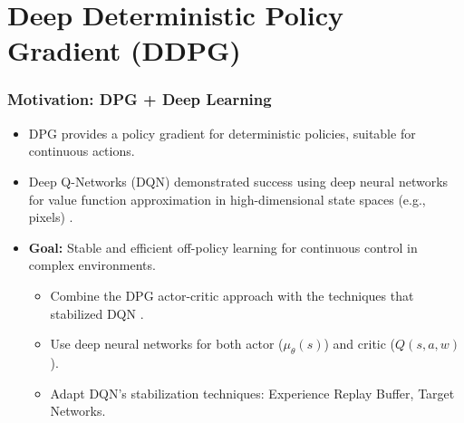 \documentclass[9pt, aspectratio=169]{beamer}
\begin{document}

\section{Deep Deterministic Policy Gradient (DDPG)}

\begin{frame}
  \frametitle{Motivation: DPG + Deep Learning}
    \begin{itemize}
        \item DPG provides a policy gradient for deterministic policies, suitable for continuous actions.
        \item Deep Q-Networks (DQN) demonstrated success using deep neural networks for value function approximation in high-dimensional state spaces (e.g., pixels) \cite{mnih2013playingatarideepreinforcement}.
        \item \textbf{Goal:} Stable and efficient off-policy learning for continuous control in complex environments.
          \begin{itemize}
              \item Combine the DPG actor-critic approach with the techniques that stabilized DQN \cite{lillicrap2015continuous}.
              \item Use deep neural networks for both actor ($\mu_\theta(s)$) and critic ($Q(s, a, w)$).
              \item Adapt DQN's stabilization techniques: Experience Replay Buffer, Target Networks.
          \end{itemize}
    \end{itemize}
\end{frame}
\end{document}
